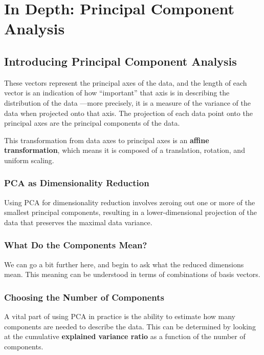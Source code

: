 \chapter{In Depth: Principal Component Analysis\label{Ch45}}

\section{Introducing Principal Component Analysis}
These vectors represent the principal axes of the data, and the length of each vector is
an indication of how “important” that axis is in describing the distribution of the data
—more precisely, it is a measure of the variance of the data when projected onto that
axis. The projection of each data point onto the principal axes are the principal components of the data.

This transformation from data axes to principal axes is an \textbf{affine transformation},
which means it is composed of a translation, rotation, and uniform scaling.

\subsection{PCA as Dimensionality Reduction}
Using PCA for dimensionality reduction involves zeroing out one or more of the
smallest principal components, resulting in a lower-dimensional projection of the
data that preserves the maximal data variance.

\subsection{What Do the Components Mean?}
We can go a bit further here, and begin to ask what the reduced dimensions mean.
This meaning can be understood in terms of combinations of basis vectors.
\subsection{Choosing the Number of Components}
A vital part of using PCA in practice is the ability to estimate how many components are needed to describe the data. This can be determined by looking at the cumulative \textbf{explained variance ratio} as a function of the number of components.

